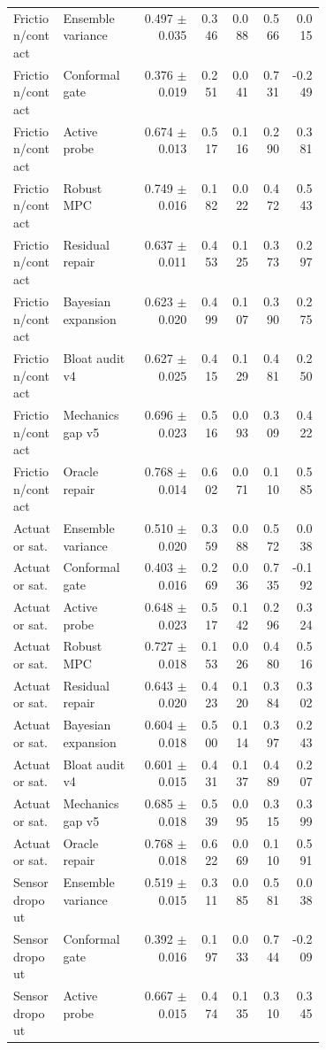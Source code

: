 \documentclass{article}
\begin{document}
\begin{center}
\begin{longtable}{p{0.16\linewidth}p{0.25\linewidth}rrrrr}
Friction/contact & Ensemble variance & 0.497 $\pm$ 0.035 & 0.346 & 0.088 & 0.566 & 0.015\\
Friction/contact & Conformal gate & 0.376 $\pm$ 0.019 & 0.251 & 0.041 & 0.731 & -0.249\\
Friction/contact & Active probe & 0.674 $\pm$ 0.013 & 0.517 & 0.116 & 0.290 & 0.381\\
Friction/contact & Robust MPC & 0.749 $\pm$ 0.016 & 0.182 & 0.022 & 0.472 & 0.543\\
Friction/contact & Residual repair & 0.637 $\pm$ 0.011 & 0.453 & 0.125 & 0.373 & 0.297\\
Friction/contact & Bayesian expansion & 0.623 $\pm$ 0.020 & 0.499 & 0.107 & 0.390 & 0.275\\
Friction/contact & Bloat audit v4 & 0.627 $\pm$ 0.025 & 0.415 & 0.129 & 0.481 & 0.250\\
Friction/contact & Mechanics gap v5 & 0.696 $\pm$ 0.023 & 0.516 & 0.093 & 0.309 & 0.422\\
Friction/contact & Oracle repair & 0.768 $\pm$ 0.014 & 0.602 & 0.071 & 0.110 & 0.585\\
Actuator sat. & Ensemble variance & 0.510 $\pm$ 0.020 & 0.359 & 0.088 & 0.572 & 0.038\\
Actuator sat. & Conformal gate & 0.403 $\pm$ 0.016 & 0.269 & 0.036 & 0.735 & -0.192\\
Actuator sat. & Active probe & 0.648 $\pm$ 0.023 & 0.517 & 0.142 & 0.296 & 0.324\\
Actuator sat. & Robust MPC & 0.727 $\pm$ 0.018 & 0.153 & 0.026 & 0.480 & 0.516\\
Actuator sat. & Residual repair & 0.643 $\pm$ 0.020 & 0.423 & 0.120 & 0.384 & 0.302\\
Actuator sat. & Bayesian expansion & 0.604 $\pm$ 0.018 & 0.500 & 0.114 & 0.397 & 0.243\\
Actuator sat. & Bloat audit v4 & 0.601 $\pm$ 0.015 & 0.431 & 0.137 & 0.489 & 0.207\\
Actuator sat. & Mechanics gap v5 & 0.685 $\pm$ 0.018 & 0.539 & 0.095 & 0.315 & 0.399\\
Actuator sat. & Oracle repair & 0.768 $\pm$ 0.018 & 0.622 & 0.069 & 0.110 & 0.591\\
Sensor dropout & Ensemble variance & 0.519 $\pm$ 0.015 & 0.311 & 0.085 & 0.581 & 0.038\\
Sensor dropout & Conformal gate & 0.392 $\pm$ 0.016 & 0.197 & 0.033 & 0.744 & -0.209\\
Sensor dropout & Active probe & 0.667 $\pm$ 0.015 & 0.474 & 0.135 & 0.310 & 0.345\\

\end{longtable}
\end{center}
\end{document}
